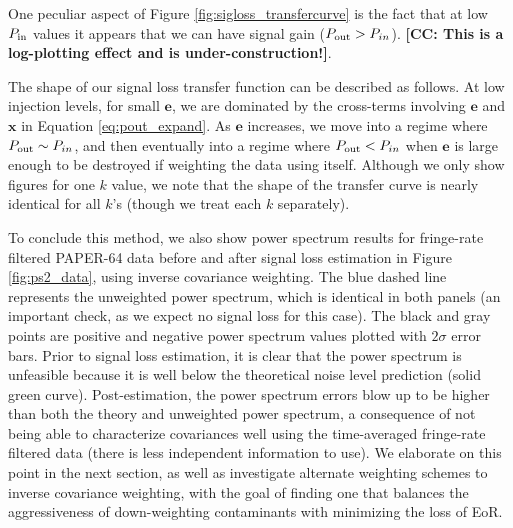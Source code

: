 \documentclass[preprint2,numberedappendix,tighten]{aastex6}  %
\newcommand{\cc}[1]{{\color{purple} \textbf{[CC: #1]}}}
\begin{document}
One peculiar aspect of Figure \ref{fig:sigloss_transfercurve} is the fact that at low $P_{\rm in}$ values it appears that we can have signal gain ($P_{\rm out} > P_{in}$). \cc{This is a log-plotting effect and is under-construction!}.

The shape of our signal loss transfer function can be described as follows. At low injection levels, for small $\textbf{e}$, we are dominated by the cross-terms involving $\textbf{e}$ and $\textbf{x}$ in Equation \eqref{eq:pout_expand}. As $\textbf{e}$ increases, we move 
into a regime where $P_{\rm out} \sim P_{in}$, and then eventually into a regime where $P_{\rm out} < P_{in}$ when $\textbf{e}$ is 
large enough to be destroyed if weighting the data using itself. Although we only show figures for one $k$ value, we note that 
the shape of the transfer curve is nearly identical for all $k$'s (though we treat each $k$ separately).


To conclude this method, we also show power spectrum results for fringe-rate filtered PAPER-64 data before and after signal 
loss estimation in Figure \ref{fig:ps2_data}, using inverse covariance weighting. The blue dashed line represents the unweighted 
power spectrum, which is identical in both panels (an important check, as we expect no signal loss for this case). The black and 
gray points are positive and negative power spectrum values plotted with $2\sigma$ error bars. Prior to signal loss estimation, it 
is clear that the power spectrum is unfeasible because it is well below the theoretical noise level prediction (solid green curve). 
Post-estimation, the power spectrum errors blow up to be higher than both the theory and unweighted power spectrum, a consequence of not being able to characterize covariances well using the time-averaged fringe-rate filtered data (there is less independent information to use). We elaborate on this point in the next section, as well as investigate alternate 
weighting schemes to inverse covariance weighting, with the goal of finding one that balances the aggressiveness of down-weighting contaminants with minimizing the loss of EoR. 
\end{document}
